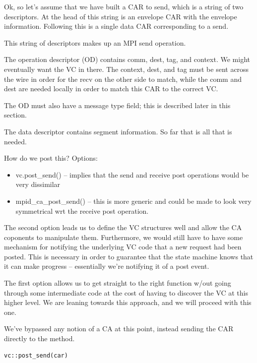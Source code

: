 \documentclass[11pt,letterpaper]{article}
\begin{document}
Ok, so let's assume that we have built a CAR to send, which is a string of two
descriptors.  At the head of this string is an envelope CAR with the envelope
information.  Following this is a single data CAR corresponding to a send.

This string of descriptors makes up an MPI send operation.

The operation descriptor (OD) contains comm, dest, tag, and context.  We might
eventually want the VC in there.  The context, dest, and tag must be sent
across the wire in order for the recv on the other side to match, while the
comm and dest are needed locally in order to match this CAR to the correct
VC.

The OD must also have a message type field; this is described later in this
section.


The data descriptor contains segment information.  So far that is all that is
needed.

How do we post this?  Options:
\begin{itemize}
\item vc.post\_send() -- implies that the send and receive post operations would
  be very dissimilar
\item mpid\_ca\_post\_send() -- this is more generic and could be made to look
  very symmetrical wrt the receive post operation.
\end{itemize}

The second option leads us to define the VC structures well and allow the CA
coponents to manipulate them.  Furthermore, we would still have to have some
mechanism for notifying the underlying VC code that a new request had been
posted.  This is necessary in order to guarantee that the state machine knows
that it can make progress -- essentially we're notifying it of a post event.

The first option allows us to get straight to the right function w/out going
through some intermediate code at the cost of having to discover the VC at this
higher level.  We are leaning towards this approach, and we will proceed with
this one.

We've bypassed any notion of a CA at this point, instead sending the CAR
directly to the method.

\begin{verbatim}
vc::post_send(car)
\end{verbatim}
\end{document}
